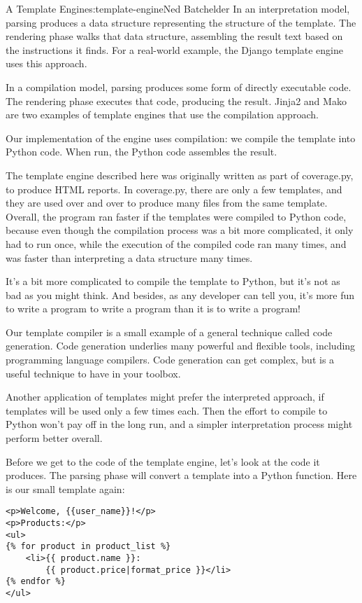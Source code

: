 \begin{aosachapter}{A Template Engine}{s:template-engine}{Ned Batchelder}
In an interpretation model, parsing produces a data structure
representing the structure of the template. The rendering phase walks
that data structure, assembling the result text based on the
instructions it finds. For a real-world example, the Django template
engine uses this approach.

In a compilation model, parsing produces some form of directly
executable code. The rendering phase executes that code, producing the
result. Jinja2 and Mako are two examples of template engines that use
the compilation approach.

Our implementation of the engine uses compilation: we compile the
template into Python code. When run, the Python code assembles the
result.

The template engine described here was originally written as part of
coverage.py, to produce HTML reports. In coverage.py, there are only a
few templates, and they are used over and over to produce many files
from the same template. Overall, the program ran faster if the templates
were compiled to Python code, because even though the compilation
process was a bit more complicated, it only had to run once, while the
execution of the compiled code ran many times, and was faster than
interpreting a data structure many times.

It's a bit more complicated to compile the template to Python, but it's
not as bad as you might think. And besides, as any developer can tell
you, it's more fun to write a program to write a program than it is to
write a program!

Our template compiler is a small example of a general technique called
code generation. Code generation underlies many powerful and flexible
tools, including programming language compilers. Code generation can get
complex, but is a useful technique to have in your toolbox.

Another application of templates might prefer the interpreted approach,
if templates will be used only a few times each. Then the effort to
compile to Python won't pay off in the long run, and a simpler
interpretation process might perform better overall.

\label{compiling-to-python}

Before we get to the code of the template engine, let's look at the code
it produces. The parsing phase will convert a template into a Python
function. Here is our small template again:

\begin{verbatim}
<p>Welcome, {{user_name}}!</p>
<p>Products:</p>
<ul>
{% for product in product_list %}
    <li>{{ product.name }}:
        {{ product.price|format_price }}</li>
{% endfor %}
</ul>
\end{verbatim}


\end{aosachapter}
